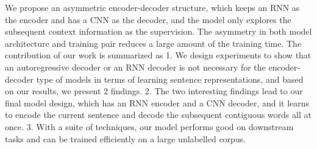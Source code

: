 We propose an asymmetric encoder-decoder structure, which keeps an RNN as the encoder and has a CNN as the decoder, and the model only explores the subsequent context information as the supervision. The asymmetry in both model architecture and training pair reduces a large amount of the training time. The contribution of our work is summarized as 1. We design experiments to show that an autoregressive decoder or an RNN decoder is not necessary for the encoder-decoder type of models in terms of learning sentence representations, and based on our results, we present 2 findings. 2. The two interesting findings lead to our final model design, which has an RNN encoder and a CNN decoder, and it learns to encode the current sentence and decode the subsequent contiguous words all at once. 3. With a suite of techniques, our model performs good on downstream tasks and can be trained efficiently on a large unlabelled corpus.
